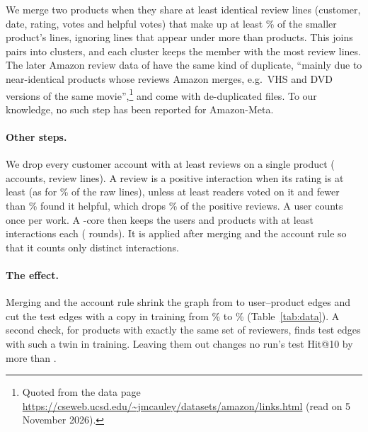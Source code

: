 We merge two products when they share at least  identical review lines
(customer, date, rating, votes and helpful votes) that make up at least
\% of the smaller product's lines, ignoring lines that appear under
more than  products. This joins  pairs into
 clusters, and each cluster keeps the member with the most review lines.
The later Amazon review data of \citet{mcauley2015image} have the same kind of duplicate,
``mainly due to near-identical products whose reviews Amazon merges, e.g.\ VHS and DVD versions of
the same movie'',\footnote{Quoted from the data page
\url{https://cseweb.ucsd.edu/~jmcauley/datasets/amazon/links.html} (read on 5 November 2026).} and
come with de-duplicated files. To our knowledge, no such step has been reported for Amazon-Meta.

\paragraph{Other steps.} We drop every customer account with at least
 reviews on a single product ( accounts,
 review lines). A review is a positive interaction when its rating is at
least  (as for \% of the raw lines), unless at least
 readers voted on it and fewer than \% found it
helpful, which drops \% of the positive reviews. A user counts once per
work. A -core then keeps the users and products with at least 
interactions each ( rounds). It is applied after merging and the account
rule so that it counts only distinct interactions.



\paragraph{The effect.} Merging and the account rule shrink the graph from  to
 user--product edges and cut the test edges with a copy in training from
\% to \% (Table~\ref{tab:data}). A second check, for
products with exactly the same set of reviewers, finds  test edges with such a twin
in training. Leaving them out changes no run's test Hit@10 by more than .

